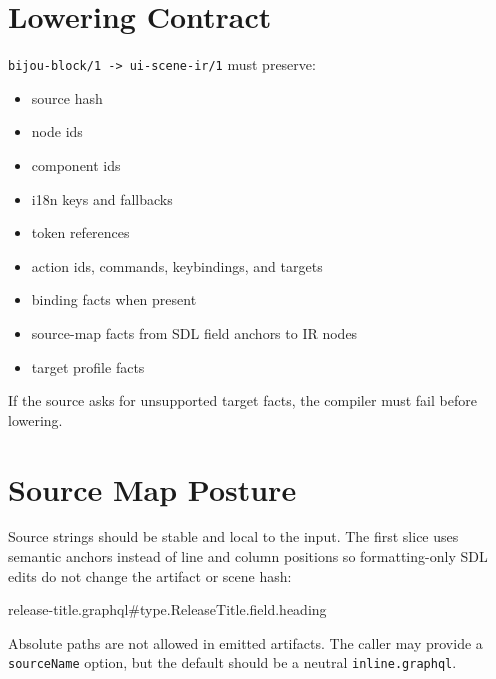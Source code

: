 \section{Lowering Contract}\label{record-140-lowering-contract}

\texttt{b\allowbreak{}i\allowbreak{}j\allowbreak{}o\allowbreak{}u\allowbreak{}-\allowbreak{}b\allowbreak{}l\allowbreak{}o\allowbreak{}c\allowbreak{}k\allowbreak{}/\allowbreak{}1\allowbreak{} \allowbreak{}-\allowbreak{}>\allowbreak{} \allowbreak{}u\allowbreak{}i\allowbreak{}-\allowbreak{}s\allowbreak{}c\allowbreak{}e\allowbreak{}n\allowbreak{}e\allowbreak{}-\allowbreak{}i\allowbreak{}r\allowbreak{}/\allowbreak{}1} must preserve:

\begin{itemize}
\tightlist
\item
  source hash
\item
  node ids
\item
  component ids
\item
  i18n keys and fallbacks
\item
  token references
\item
  action ids, commands, keybindings, and targets
\item
  binding facts when present
\item
  source-map facts from SDL field anchors to IR nodes
\item
  target profile facts
\end{itemize}

If the source asks for unsupported target facts, the compiler must fail before lowering.

\section{Source Map Posture}\label{record-140-source-map-posture}

Source strings should be stable and local to the input. The first slice uses semantic anchors instead of line and column positions so formatting-only SDL edits do not change the artifact or scene hash:

\begin{CodeBlock}
release-title.graphql#type.ReleaseTitle.field.heading
\end{CodeBlock}

Absolute paths are not allowed in emitted artifacts. The caller may provide a \texttt{s\allowbreak{}o\allowbreak{}u\allowbreak{}r\allowbreak{}c\allowbreak{}e\allowbreak{}N\allowbreak{}a\allowbreak{}m\allowbreak{}e} option, but the default should be a neutral \texttt{i\allowbreak{}n\allowbreak{}l\allowbreak{}i\allowbreak{}n\allowbreak{}e\allowbreak{}.\allowbreak{}g\allowbreak{}r\allowbreak{}a\allowbreak{}p\allowbreak{}h\allowbreak{}q\allowbreak{}l}.

